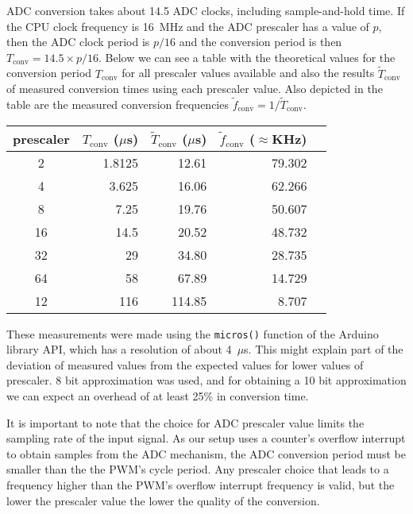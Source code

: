 ADC conversion takes about 14.5 ADC clocks, including sample-and-hold time. If the CPU clock
frequency is 16~MHz and the ADC prescaler has a value of $p$, then the ADC clock
period is $p/16$ and the conversion period is then $T_\text{conv} = 14.5 \times p / 16$.
Below we can see a table with the theoretical values for the conversion period $T_\text{conv}$ for
all prescaler values available and also the results $\tilde{T}_\text{conv}$ of measured conversion
times using each prescaler value. Also depicted
in the table are the measured conversion frequencies $\tilde{f}_\text{conv}=1/\tilde{T}_\text{conv}$.

\begin{center}
\begin{tabular}{crrrr}
\toprule
\toprule
\footnotesize{prescaler} &
\footnotesize{$T_\text{conv}$ ($\mu$s)} & \footnotesize{$\tilde{T}_\text{conv}$ ($\mu$s)} & \footnotesize{$\tilde{f}_\text{conv}$ ($\approx$KHz)} \\
\midrule
2 & 1.8125 & 12.61 & 79.302\\
4 & 3.625 & 16.06  & 62.266 \\
8 & 7.25 & 19.76  & 50.607 \\
16& 14.5 & 20.52  & 48.732 \\
32& 29 & 34.80  & 28.735 \\
64& 58 & 67.89  & 14.729 \\
12& 116 & 114.85 & 8.707  \\
\bottomrule
\end{tabular}
\end{center}

These measurements were made using the \texttt{micros()} function of the
Arduino library API, which has a resolution of about 4~$\mu$s. This might explain
part of the deviation of measured values from the expected values for lower values of prescaler.
8 bit approximation was used, and for obtaining a 10 bit approximation we
can expect an overhead of at least 25\% in conversion time.

It is important to note that the choice for ADC prescaler value limits
the sampling rate of the input signal. As our setup uses a counter's overflow interrupt
to obtain samples from the ADC mechanism, the ADC conversion period must be smaller
than the the PWM's cycle period. Any prescaler choice that leads to a frequency
higher than the PWM's overflow interrupt frequency is valid, but the lower the
prescaler value the lower the quality of the conversion. 


